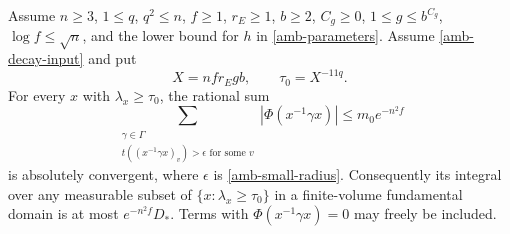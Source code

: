 \begin{theorem}\label{amb-far}
Assume $n\ge3$, $1\le q$, $q^2\le n$, $f\ge1$,
$r_E\ge1$, $b\ge2$, $C_g\ge0$, $1\le g\le b^{C_g}$,
$\log f\le\sqrt n$, and the lower bound for $h$ in
\eqref{amb-parameters}. Assume \eqref{amb-decay-input} and put
\begin{equation}\label{amb-truncation}
                X=nfr_Egb,\qquad \tau_0=X^{-11q}.
\end{equation}
For every $x$ with $\lambda_x\ge\tau_0$, the rational sum
\begin{equation}\label{amb-far-sum}
 \sum_{\substack{\gamma\in\Gamma\\
       t((x^{-1}\gamma x)_v)>\epsilon\text{ for some }v}}
                     |\Phi(x^{-1}\gamma x)|
                              \le m_0e^{-n^2f}
\end{equation}
is absolutely convergent, where $\epsilon$ is
\eqref{amb-small-radius}. Consequently its integral over any
measurable subset of $\{x:\lambda_x\ge\tau_0\}$ in a
finite-volume fundamental domain is at most $e^{-n^2f}D_*$.
Terms with $\Phi(x^{-1}\gamma x)=0$ may freely be included.
\end{theorem}
